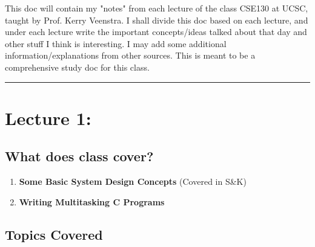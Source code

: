\documentclass{article}
\begin{document}
This doc will contain my "notes" from each lecture of the class CSE130 at UCSC, taught by Prof. Kerry Veenstra. I shall divide this doc based on each lecture, and under each lecture write the important concepts/ideas talked about that day and other stuff I think is interesting. I may add some additional information/explanations from other sources. This is meant to be a comprehensive study doc for this class.
\begin{center}
	\rule{450pt}{3pt} 
\end{center}
\newpage

\section*{Lecture 1:}


\subsection*{What does class cover?}

\begin{enumerate}
    \item \textbf{Some Basic System Design Concepts} (Covered in S\&K)
    \item \textbf{Writing Multitasking C Programs} 
\end{enumerate}

\subsection*{Topics Covered}
\end{document}
